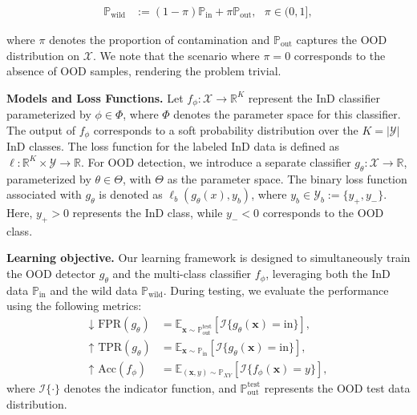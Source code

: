 \documentclass[10pt]{article} %
\theoremstyle{plain}
\theoremstyle{definition}
\begin{document}
\begin{align}
\label{huber}
\mathbb{P}_{\text{wild}} & := (1 - \pi)\mathbb{P}_{\text{in}} + \pi \mathbb{P}_{\text{out}}, ~~~ \pi \in (0, 1],
\end{align}

where $\pi$ denotes the proportion of contamination and $\mathbb{P}_{\text{out}}$ captures the OOD distribution on $\mathcal{X}$. We note that the scenario where $\pi = 0$ corresponds to the absence of OOD samples, rendering the problem trivial.

\textbf{Models and Loss Functions.}
Let $f_\phi: \mathcal{X} \to \mathbb{R}^K$ represent the InD classifier parameterized by $\phi \in \Phi$, where $\Phi$ denotes the parameter space for this classifier. The output of $f_\phi$ corresponds to a soft probability distribution over the $K=|\mathcal{Y}|$ InD classes. The loss function for the labeled InD data is defined as $\ell: \mathbb{R}^K \times \mathcal{Y} \to \mathbb{R}$.  
For OOD detection, we introduce a separate classifier $g_\theta: \mathcal{X} \to \mathbb{R}$, parameterized by $\theta \in \Theta$, with $\Theta$ as the parameter space. The binary loss function associated with $g_\theta$ is denoted as $\ell_b(g_\theta(x), y_b)$, where $y_b \in \mathcal{Y}_b := \{y_+, y_-\}$. Here, $y_+ > 0$ represents the InD class, while $y_- < 0$ corresponds to the OOD class.

\textbf{Learning objective.}
Our learning framework is designed to simultaneously train the OOD detector \( g_\theta \) and the multi-class classifier \( f_\phi \), leveraging both the InD data \( \mathbb{P}_{\text{in}} \) and the wild data \( \mathbb{P}_{\text{wild}} \). During testing, we evaluate the performance using the following metrics:
\begin{align}
    \text{↓ FPR}(g_\theta) &= \mathbb{E}_{\bm{x} \sim \mathbb{P}_{\text{out}}^{\text{test}}}\left[ \mathbb{\mathcal{I}}\{g_\theta(\bm{x}) = \text{in}\} \right], \nonumber \\
    \text{↑ TPR}(g_\theta) &= \mathbb{E}_{\bm{x} \sim \mathbb{P}_{\text{in}}}\left[ \mathbb{\mathcal{I}}\{g_\theta(\bm{x}) = \text{in}\} \right], \nonumber  \\
    \text{↑ Acc}(f_\phi) &= \mathbb{E}_{(\bm{x}, y) \sim \mathbb{P}_{{XY}}}\left[ \mathbb{\mathcal{I}}\{f_\phi(\bm{x}) = y\} \right], \nonumber
\end{align}
where \( \mathbb{\mathcal{I}}\{\cdot\} \) denotes the indicator function, and $\mathbb{P}_{\text{out}}^{\text{test}}$ represents the OOD test data distribution.
\end{document}
